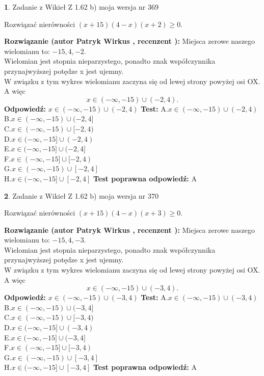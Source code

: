\documentclass[12pt, a4paper]{article}
\theoremstyle{definition} %
\newtheorem{zad}{}
\newcommand{\zadStart}[1]{\begin{zad}#1\newline}
\newcommand{\zadStop}{\end{zad}}
\newcommand{\rozwStart}[2]{\noindent \textbf{Rozwiązanie (autor #1 , recenzent #2): }\newline}
\newcommand{\rozwStop}{\newline}
\newcommand{\odpStart}{\noindent \textbf{Odpowiedź:}\newline}
\newcommand{\odpStop}{\newline}
\newcommand{\testStart}{\noindent \textbf{Test:}\newline}
\newcommand{\testStop}{\newline}
\newcommand{\kluczStart}{\noindent \textbf{Test poprawna odpowiedź:}\newline}
\newcommand{\kluczStop}{\newline}
\begin{document}
\zadStart{Zadanie z Wikieł Z 1.62 b) moja wersja nr 369}

Rozwiązać nierówności $(x+15)(4-x)(x+2)\ge0$.
\zadStop
\rozwStart{Patryk Wirkus}{}
Miejsca zerowe naszego wielomianu to: $-15, 4, -2$.\\
Wielomian jest stopnia nieparzystego, ponadto znak współczynnika przy\linebreak najwyższej potędze x jest ujemny.\\ W związku z tym wykres wielomianu zaczyna się od lewej strony powyżej osi OX. A więc $$x \in (-\infty,-15) \cup (-2,4).$$
\rozwStop
\odpStart
$x \in (-\infty,-15) \cup (-2,4)$
\odpStop
\testStart
A.$x \in (-\infty,-15) \cup (-2,4)$\\
B.$x \in (-\infty,-15) \cup (-2,4]$\\
C.$x \in (-\infty,-15) \cup [-2,4)$\\
D.$x \in (-\infty,-15] \cup (-2,4)$\\
E.$x \in (-\infty,-15] \cup (-2,4]$\\
F.$x \in (-\infty,-15] \cup [-2,4)$\\
G.$x \in (-\infty,-15) \cup [-2,4]$\\
H.$x \in (-\infty,-15] \cup [-2,4]$
\testStop
\kluczStart
A
\kluczStop



\zadStart{Zadanie z Wikieł Z 1.62 b) moja wersja nr 370}

Rozwiązać nierówności $(x+15)(4-x)(x+3)\ge0$.
\zadStop
\rozwStart{Patryk Wirkus}{}
Miejsca zerowe naszego wielomianu to: $-15, 4, -3$.\\
Wielomian jest stopnia nieparzystego, ponadto znak współczynnika przy\linebreak najwyższej potędze x jest ujemny.\\ W związku z tym wykres wielomianu zaczyna się od lewej strony powyżej osi OX. A więc $$x \in (-\infty,-15) \cup (-3,4).$$
\rozwStop
\odpStart
$x \in (-\infty,-15) \cup (-3,4)$
\odpStop
\testStart
A.$x \in (-\infty,-15) \cup (-3,4)$\\
B.$x \in (-\infty,-15) \cup (-3,4]$\\
C.$x \in (-\infty,-15) \cup [-3,4)$\\
D.$x \in (-\infty,-15] \cup (-3,4)$\\
E.$x \in (-\infty,-15] \cup (-3,4]$\\
F.$x \in (-\infty,-15] \cup [-3,4)$\\
G.$x \in (-\infty,-15) \cup [-3,4]$\\
H.$x \in (-\infty,-15] \cup [-3,4]$
\testStop
\kluczStart
A
\kluczStop
\end{document}
